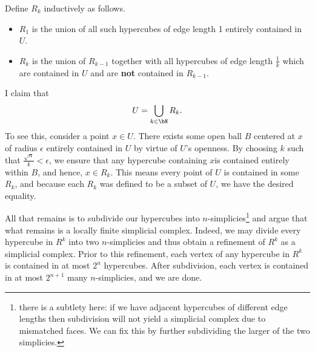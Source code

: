 \begin{homework}[e]
\begin{prf}
		Define $R_k$ inductively as follows. 
		\begin{itemize}
			\item $R_1$ is the union of all such hypercubes of edge length 1 entirely contained in $U$.
			\item $R_k$ is the union of $R_{k-1}$ together with all hypercubes of edge length $\frac{1}{k}$ which are contained in $U$ and are \textbf{not} contained in $R_{k-1}$.
		\end{itemize} 
		I claim that
		\begin{align*}
			U = \bigcup_{k \in \bN} R_k.
		\end{align*}
		To see this, consider a point $x \in U$. There exists some open ball $B$ centered at $x$ of radius $\epsilon$ entirely contained in $U$ by virtue of $U$'s openness. By choosing $k$ such that $\frac{\sqrt{n}}{k} < \epsilon$, we ensure that any hypercube containing $x$is contained entirely within $B$, and hence, $x \in R_k$. This means every point of $U$ is contained in some $R_k$, and because each $R_k$ was defined to be a subset of $U$, we have the desired equality.

		All that remains is to subdivide our hypercubes into $n$-simplicies\footnote{there is a subtlety here: if we have adjacent hypercubes of different edge lengths then subdivision will not yield a simplicial complex due to mismatched faces. We can fix this by further subdividing the larger of the two simplicies.} and argue that what remains is a locally finite simplicial complex. Indeed, we may divide every hypercube in $R^k$ into two $n$-simplicies and thus obtain a refinement of $R^k$ as a simplicial complex. Prior to this refinement, each vertex of any hypercube in $R^k$ is contained in at most $2^n$ hypercubes. After subdivision, each vertex is contained in at most $2^{n+1}$ many $n$-simplicies, and we are done.
	\end{prf}

\end{homework}


